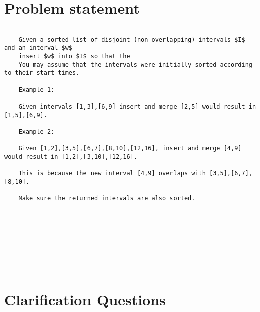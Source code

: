 \section{Problem statement}
\begin{exercise}
\label{example:merge_intervals_2:exercice1}
\begin{verbatim}
	
	Given a sorted list of disjoint (non-overlapping) intervals $I$ and an interval $w$
	insert $w$ into $I$ so that the 
	You may assume that the intervals were initially sorted according to their start times.
	
	Example 1:
	
	Given intervals [1,3],[6,9] insert and merge [2,5] would result in [1,5],[6,9].
	
	Example 2:
	
	Given [1,2],[3,5],[6,7],[8,10],[12,16], insert and merge [4,9] would result in [1,2],[3,10],[12,16].
	
	This is because the new interval [4,9] overlaps with [3,5],[6,7],[8,10].
	
	Make sure the returned intervals are also sorted.
\end{verbatim}

	\begin{example}
		\label{example:merge_intervals_2:example1}
		\hfill \\
	
		
	\end{example}

	\begin{example}
		\label{example:merge_intervals_2:example2}
		\hfill \\
		
	\end{example}

	\begin{example}
		\hfill \\
	
	\label{ex:merge_intervals_2:example3}
	\end{example}

	\begin{example}
		\hfill \\

	\label{ex:merge_intervals_2:example4}	
	\end{example}
\end{exercise}

\section{Clarification Questions}

